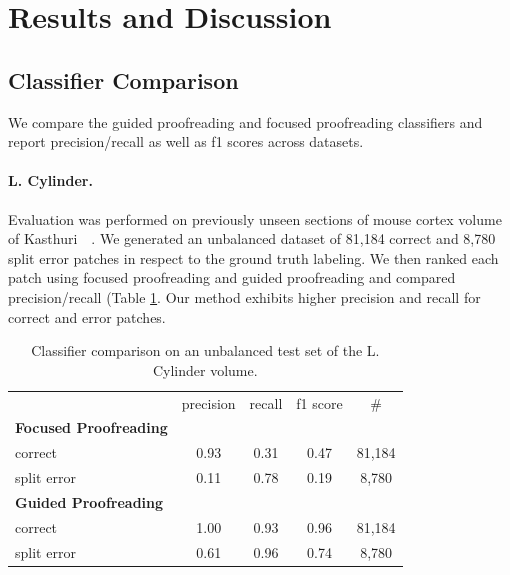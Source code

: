 



\section{Results and Discussion}


\subsection{Classifier Comparison}

We compare the guided proofreading and focused proofreading classifiers and report precision/recall as well as f1 scores across datasets.

\paragraph{L. Cylinder.} Evaluation was performed on previously unseen sections of mouse cortex volume of Kasthuri~\etal~\cite{kasthuri2015saturated}. We generated an unbalanced dataset of 81,184 correct and 8,780 split error patches in respect to the ground truth labeling. We then ranked each patch using focused proofreading and guided proofreading and compared precision/recall (Table \ref{tab:prcyl}. Our method exhibits higher precision and recall for correct and error patches.

\begin{table}[h]
\caption{Classifier comparison on an unbalanced test set of the L. Cylinder volume.}%

\small{
\begin{tabular}{l|c|c|c|c}

 & precision & recall & f1 score & \# \\ 
\textbf{Focused Proofreading} & ~ & ~ & ~ & ~ \\ 
correct & 0.93 & 0.31 & 0.47 & 81,184 \\ 
split error & 0.11 & 0.78 & 0.19 & 8,780 \\ 
\textbf{Guided Proofreading} & ~ & ~ & ~ & ~ \\ 
correct & 1.00 & 0.93 & 0.96 & 81,184 \\ 
split error & 0.61 & 0.96 & 0.74 & 8,780 \\ 
\end{tabular} 
}
\label{tab:prcyl}
\end{table}

